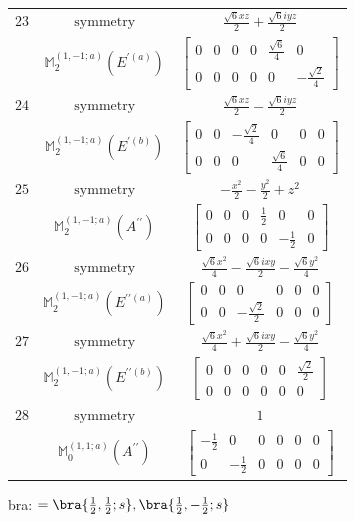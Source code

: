 \documentclass[fleqn,8pt,landscape]{jsarticle}
\begin{document}
\begin{longtable}{ccc}
$ 23 $ & $ \text{symmetry} $ & $ \frac{\sqrt{6} x z}{2} + \frac{\sqrt{6} i y z}{2} $ \\
$  $ & $ \mathbb{M}_{2}^{(1,-1;a)}(E^{\prime(a)}) $ & $ \begin{bmatrix} 0 & 0 & 0 & 0 & \frac{\sqrt{6}}{4} & 0 \\ 0 & 0 & 0 & 0 & 0 & - \frac{\sqrt{2}}{4} \end{bmatrix} $ \\ \hline
$ 24 $ & $ \text{symmetry} $ & $ \frac{\sqrt{6} x z}{2} - \frac{\sqrt{6} i y z}{2} $ \\
$  $ & $ \mathbb{M}_{2}^{(1,-1;a)}(E^{\prime(b)}) $ & $ \begin{bmatrix} 0 & 0 & - \frac{\sqrt{2}}{4} & 0 & 0 & 0 \\ 0 & 0 & 0 & \frac{\sqrt{6}}{4} & 0 & 0 \end{bmatrix} $ \\ \hline
$ 25 $ & $ \text{symmetry} $ & $ - \frac{x^{2}}{2} - \frac{y^{2}}{2} + z^{2} $ \\
$  $ & $ \mathbb{M}_{2}^{(1,-1;a)}(A^{\prime\prime}) $ & $ \begin{bmatrix} 0 & 0 & 0 & \frac{1}{2} & 0 & 0 \\ 0 & 0 & 0 & 0 & - \frac{1}{2} & 0 \end{bmatrix} $ \\ \hline
$ 26 $ & $ \text{symmetry} $ & $ \frac{\sqrt{6} x^{2}}{4} - \frac{\sqrt{6} i x y}{2} - \frac{\sqrt{6} y^{2}}{4} $ \\
$  $ & $ \mathbb{M}_{2}^{(1,-1;a)}(E^{\prime\prime(a)}) $ & $ \begin{bmatrix} 0 & 0 & 0 & 0 & 0 & 0 \\ 0 & 0 & - \frac{\sqrt{2}}{2} & 0 & 0 & 0 \end{bmatrix} $ \\ \hline
$ 27 $ & $ \text{symmetry} $ & $ \frac{\sqrt{6} x^{2}}{4} + \frac{\sqrt{6} i x y}{2} - \frac{\sqrt{6} y^{2}}{4} $ \\
$  $ & $ \mathbb{M}_{2}^{(1,-1;a)}(E^{\prime\prime(b)}) $ & $ \begin{bmatrix} 0 & 0 & 0 & 0 & 0 & \frac{\sqrt{2}}{2} \\ 0 & 0 & 0 & 0 & 0 & 0 \end{bmatrix} $ \\ \hline
$ 28 $ & $ \text{symmetry} $ & $ 1 $ \\
$  $ & $ \mathbb{M}_{0}^{(1,1;a)}(A^{\prime\prime}) $ & $ \begin{bmatrix} - \frac{1}{2} & 0 & 0 & 0 & 0 & 0 \\ 0 & - \frac{1}{2} & 0 & 0 & 0 & 0 \end{bmatrix} $ \\ \hline
\end{longtable}
bra: $=\bra{\frac{1}{2},\frac{1}{2};s}, \bra{\frac{1}{2},- \frac{1}{2};s}$
\end{document}
